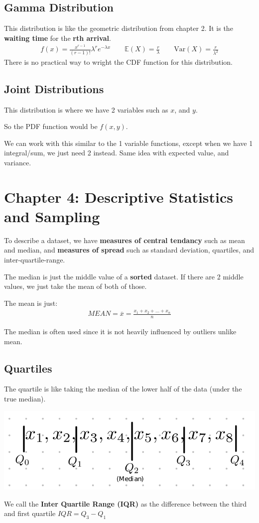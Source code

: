 \documentclass[12pt,letterpaper]{article} \usepackage{amsmath} \usepackage{graphicx} \usepackage[margin=1in]{geometry} \usepackage{longtable}  \usepackage{amssymb}
\begin{document}
	\subsection{Gamma Distribution}
	This distribution is like the geometric distribution from chapter 2. It is the \textbf{waiting time} for the \textbf{rth arrival}. 
	\begin{align*}
		f(x) = \frac{x^{r-1}}{(r-1)!}\lambda^re^{-\lambda x}  \qquad \mathbb E(X)=\frac{r}{\lambda} \qquad \text{Var}(X) = \frac{r}{\lambda^2} 
	\end{align*}
	There is no practical way to wright the CDF function for this distribution.
	
	\subsection{Joint Distributions}
	This distribution is where we have 2 variables such as $x$, and $y$. 
	
	So the PDF function would be $f(x,y)$.
	
	We can work with this similar to the 1 variable functions, except when we have 1 integral/sum, we just need 2 instead. Same idea with expected value, and variance. 
	
	\section{Chapter 4: Descriptive Statistics and Sampling}
	To describe a dataset, we have \textbf{measures of central tendancy} such as mean and median, and \textbf{measures of spread} such as standard deviation, quartiles, and inter-quartile-range. 
	
	The median is just the middle value of a \textbf{sorted} dataset. If there are 2 middle values, we just take the mean of both of those. 
	
	The mean is just:
	\begin{align*}
		MEAN = \overline{x} = \frac{x_1 + x_2 + ... + x_n}{n}
	\end{align*}

	The median is often used since it is not heavily influenced by outliers unlike mean. 
	
	\subsection{Quartiles}
	The quartile is like taking the median of the lower half of the data (under the true median). 
	\begin{center}
		\includegraphics[width=0.5\linewidth]{quartiles}
	\end{center}
	We call the \textbf{Inter Quartile Range (IQR)} as the difference between the third and first quartile $IQR = Q_3-Q_1$
\end{document}
